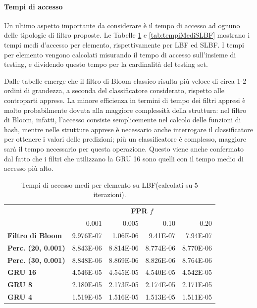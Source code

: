 \documentclass[../../main.tex]{subfiles}
\begin{document}
    \paragraph{Tempi di accesso}
    Un ultimo aspetto importante da considerare è il tempo di accesso ad ognuno delle tipologie di filtro proposte. Le Tabelle \ref{tab:tempiMediLBF} e \ref{tab:tempiMediSLBF} mostrano i tempi medi d'accesso per elemento, rispettivamente per LBF ed SLBF. I tempi per elemento vengono calcolati misurando il tempo di accesso sull'insieme di testing, e dividendo questo tempo per la cardinalità del testing set.

    Dalle tabelle emerge che il filtro di Bloom classico risulta più veloce di circa 1-2 ordini di grandezza, a seconda del classificatore considerato, rispetto alle controparti apprese. La minore efficienza in termini di tempo dei filtri appresi è molto probabilmente dovuta alla maggiore complessità della struttura: nel filtro di Bloom, infatti, l'accesso consiste semplicemente nel calcolo delle funzioni di hash, mentre nelle strutture apprese è necessario anche interrogare il classificatore per ottenere i valori delle predizioni; più un classificatore è complesso, maggiore sarà il tempo necessario per questa operazione. Questo viene anche confermato dal fatto che i filtri che utilizzano la GRU 16 sono quelli con il tempo medio di accesso più alto.

    \begin{table}[H]
        \centering
        \begin{tabular}{lrrrr}
            \toprule
            & \multicolumn{4}{c}{\textbf{FPR} $f$}\\
            & 0.001 & 0.005 & 0.10 & 0.20\\        
            \midrule
            \textbf{Filtro di Bloom} & 9.976E-07 & 1.06E-06 & 9.41E-07 & 7.94E-07\\
            \midrule
            \textbf{Perc. (20, 0.001)} & 8.843E-06 & 8.814E-06 &  8.774E-06 & 8.770E-06\\
            \textbf{Perc. (30, 0.001)} & 8.848E-06 & 8.869E-06 &  8.826E-06 & 8.764E-06\\
            \textbf{GRU 16} & 4.546E-05 & 4.545E-05 &  4.540E-05 & 4.542E-05\\
            \textbf{GRU 8} &  2.180E-05 & 2.173E-05 &  2.174E-05 & 2.171E-05\\
            \textbf{GRU 4} & 1.519E-05 & 1.516E-05 & 1.513E-05 & 1.511E-05\\
            \bottomrule
        \end{tabular}
        \caption{Tempi di accesso medi per elemento su LBF(calcolati su 5 iterazioni).}
        \label{tab:tempiMediLBF}
    \end{table}
\end{document}
